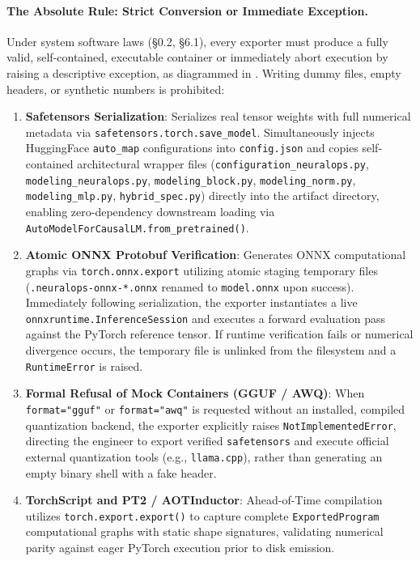 \paragraph{The Absolute Rule: Strict Conversion or Immediate Exception.}
Under system software laws (§0.2, §6.1), every exporter must produce a fully valid, self-contained, executable container or immediately abort execution by raising a descriptive exception, as diagrammed in . Writing dummy files, empty headers, or synthetic numbers is prohibited:
\begin{enumerate}
    \item \textbf{Safetensors Serialization}: Serializes real tensor weights with full numerical metadata via \texttt{safetensors.torch.save\_model}. Simultaneously injects HuggingFace \texttt{auto\_map} configurations into \texttt{config.json} and copies self-contained architectural wrapper files (\texttt{configuration\_neuralops.py}, \texttt{modeling\_neuralops.py}, \texttt{modeling\_block.py}, \texttt{modeling\_norm.py}, \texttt{modeling\_mlp.py}, \texttt{hybrid\_spec.py}) directly into the artifact directory, enabling zero-dependency downstream loading via \texttt{AutoModelForCausalLM.from\_pretrained()}.
    \item \textbf{Atomic ONNX Protobuf Verification}: Generates ONNX computational graphs via \texttt{torch.onnx.export} utilizing atomic staging temporary files (\texttt{.neuralops-onnx-*.onnx} renamed to \texttt{model.onnx} upon success). Immediately following serialization, the exporter instantiates a live \texttt{onnxruntime.InferenceSession} and executes a forward evaluation pass against the PyTorch reference tensor. If runtime verification fails or numerical divergence occurs, the temporary file is unlinked from the filesystem and a \texttt{RuntimeError} is raised.
    \item \textbf{Formal Refusal of Mock Containers (GGUF / AWQ)}: When \texttt{format="gguf"} or \texttt{format="awq"} is requested without an installed, compiled quantization backend, the exporter explicitly raises \texttt{NotImplementedError}, directing the engineer to export verified \texttt{safetensors} and execute official external quantization tools (e.g., \texttt{llama.cpp}), rather than generating an empty binary shell with a fake header.
    \item \textbf{TorchScript and PT2 / AOTInductor}: Ahead-of-Time compilation utilizes \texttt{torch.export.export()} to capture complete \texttt{ExportedProgram} computational graphs with static shape signatures, validating numerical parity against eager PyTorch execution prior to disk emission.
\end{enumerate}

